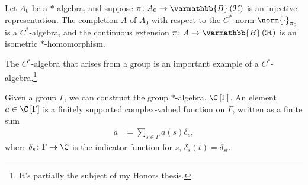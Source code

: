 \documentclass[10pt]{mypackage}
\renewcommand*{\mathbb}[1]{\varmathbb{#1}}
\newcommand{\B}{\mathbb{B}}
\begin{document}
\begin{corollary}
  Let $A_0$ be a $\ast$-algebra, and suppose $\pi\colon A_0\rightarrow \B\left(\mathcal{H}\right)$ is an injective representation. The completion $A$ of $A_0$ with respect to the $C^{\ast}$-norm $\norm{\cdot}_{\pi_0}$ is a $C^{\ast}$-algebra, and the continuous extension $\pi\colon A\rightarrow \B\left(\mathcal{H}\right)$ is an isometric $\ast$-homomorphism.
\end{corollary}
The $C^{\ast}$-algebra that arises from a group is an important example of a $C^{\ast}$-algebra.\footnote{It's partially the subject of my Honors thesis.}\newline

Given a group $\Gamma$, we can construct the group $\ast$-algebra, $\C\left[\Gamma\right]$. An element $a\in \C\left[\Gamma\right]$ is a finitely supported complex-valued function on $\Gamma$, written as a finite sum
\begin{align*}
  a &= \sum_{s\in\Gamma}a(s)\delta_s,
\end{align*}
where $\delta_s\colon \Gamma\rightarrow \C$ is the indicator function for $s$, $\delta_s\left(t\right) = \delta_{st}$.\newline
\end{document}
